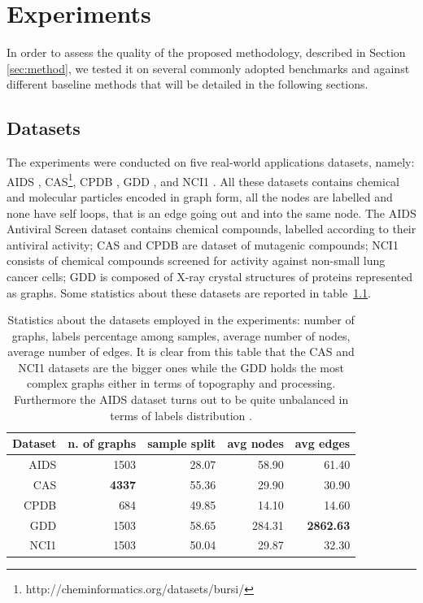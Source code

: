
\chapter{Experiments}
\label{Chapter4}

In order to assess the quality of the proposed methodology, described in Section
\ref{sec:method}, we tested it on several commonly adopted benchmarks and against
different baseline methods that will be detailed in the following sections.

\section{Datasets}
\label{subsec:datasets}

The experiments were conducted on five real-world applications datasets, namely:
AIDS \cite{Weislow19041989}, CAS\footnote{http://cheminformatics.org/datasets/bursi/},
CPDB \cite{journals/jcisd/HelmaCKR04}, GDD \cite{dobson2003}, and NCI1 \cite{journals/kais/WaleWK08}.
All these datasets contains chemical and molecular particles encoded in graph form,
all the nodes are labelled and none have self loops, that is an edge going out
and into the same node.
The AIDS Antiviral Screen dataset contains chemical compounds, labelled according to
their antiviral activity; CAS and CPDB are dataset of mutagenic
compounds; NCI1 consists of chemical compounds screened for activity against 
non-small lung cancer cells; GDD is composed of X-ray crystal structures of
proteins represented as graphs.
Some statistics about these datasets are reported in table~\ref{table:datasets}.

    \begin{table}[ht]
        \centering
        \begin{tabular}{|r|r|r|r|r|}
            \hline
            Dataset & n. of graphs & sample split & avg nodes & avg edges \\ \hline
            AIDS    & 1503         & 28.07        & 58.90     & 61.40     \\ \hline      
            CAS     & \textbf{4337} & 55.36        & 29.90     & 30.90     \\ \hline      
            CPDB    &  684         & 49.85        & 14.10     & 14.60     \\ \hline      
            GDD     & 1503         & 58.65        & 284.31    & \textbf{2862.63}   \\ \hline      
            NCI1    & 1503         & 50.04        & 29.87     & 32.30     \\ \hline      
        \end{tabular}
        \caption{Statistics about the datasets employed in the experiments: number
        of graphs, labels percentage among samples, average number of nodes, average
        number of edges. It is clear from this table that the CAS and NCI1 datasets
        are the bigger ones while the GDD holds the most complex graphs either in
        terms of topography and processing. Furthermore the AIDS dataset turns out
        to be quite unbalanced in terms of labels distribution \cite{rtesselli}.}
        \label{table:datasets}
    \end{table}

